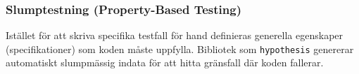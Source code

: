 \documentclass[10pt,a4paper]{report}
\begin{document}
\subsubsection{Slumptestning (Property-Based Testing)}
Istället för att skriva specifika testfall för hand definieras generella egenskaper (specifikationer) som koden måste uppfylla. Bibliotek som \texttt{hypothesis} genererar automatiskt slumpmässig indata för att hitta gränsfall där koden fallerar.
\end{document}
